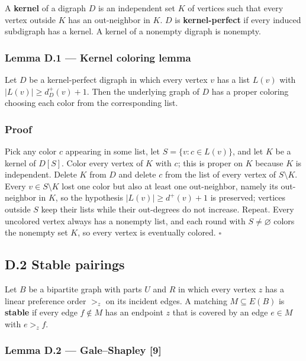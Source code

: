 \documentclass[
  american,
  11pt,
  a4paper,
]{article}
\newcounter{none} %
\begin{document}
A \textbf{kernel} of a digraph \(D\) is an independent set \(K\) of vertices such that every vertex outside \(K\) has an out-neighbor in \(K\). \(D\) is \textbf{kernel-perfect} if every induced subdigraph has a kernel. A kernel of a nonempty digraph is nonempty.

\subsubsection{Lemma D.1 --- Kernel coloring lemma}\label{lemma-d.1-kernel-coloring-lemma}

Let \(D\) be a kernel-perfect digraph in which every vertex \(v\) has a list \(L(v)\) with \(|L(v)|\ge d^+_D(v)+1\). Then the underlying graph of \(D\) has a proper coloring choosing each color from the corresponding list.

\subsubsection{Proof}\label{proof-9}

Pick any color \(c\) appearing in some list, let \(S=\{v:c\in L(v)\}\), and let \(K\) be a kernel of \(D[S]\). Color every vertex of \(K\) with \(c\); this is proper on \(K\) because \(K\) is independent. Delete \(K\) from \(D\) and delete \(c\) from the list of every vertex of \(S\setminus K\). Every \(v\in S\setminus K\) lost one color but also at least one out-neighbor, namely its out-neighbor in \(K\), so the hypothesis \(|L(v)|\ge d^+(v)+1\) is preserved; vertices outside \(S\) keep their lists while their out-degrees do not increase. Repeat. Every uncolored vertex always has a nonempty list, and each round with \(S\ne\varnothing\) colors the nonempty set \(K\), so every vertex is eventually colored. \(\square\)

\subsection{D.2 Stable pairings}\label{d.2-stable-pairings}

Let \(B\) be a bipartite graph with parts \(U\) and \(R\) in which every vertex \(z\) has a linear preference order \(>_z\) on its incident edges. A matching \(M\subseteq E(B)\) is \textbf{stable} if every edge \(f\notin M\) has an endpoint \(z\) that is covered by an edge \(e\in M\) with \(e>_zf\).

\subsubsection{Lemma D.2 --- Gale--Shapley {[}9{]}}\label{lemma-d.2-galeshapley-9}
\end{document}
